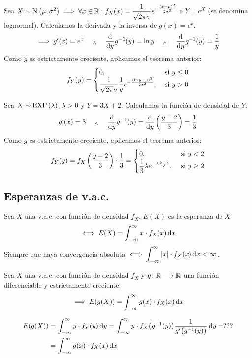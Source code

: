 \begin{ejem}
	Sea $\displaystyle X\sim\operatorname{N}\left(\mu, \sigma^2\right) \implies \forall x \in \mathbb{R}: f_X(x)=\frac{1}{\sqrt{2\pi}\sigma} e^{-\frac{(x-\mu)^2}{2\sigma^2}}$ e $Y=e^X$ (se denomina lognormal). Calculamos la derivada y la inversa de $g(x)=e^x$.
	\[\implies g'(x)=e^x \quad \we \quad  \odv{}{y} g^{-1} (y) = \ln{y} \quad \we \quad  \odv{}{y} g^{-1} (y) = \frac{1}{y}\]
	Como $g$ es estrictamente creciente, aplicamos el teorema anterior:
	\[f_Y(y) = \begin{cases}
			0,                                                                                 & \text{ si } y\leq 0 \\
			\ds \frac{1}{\sqrt{2\pi}\sigma} \frac{1}{y} e^{-\frac{(\ln{y}-\mu)^2}{2\sigma^2}}, & \text{ si } y>0     %
		\end{cases}\]
\end{ejem}

\begin{ejem}
	Sea $X\sim\operatorname{EXP}\left(\lambda\right), \lambda > 0$ y $Y=3X+2$. Calculamos la función de densidad de $Y$.
	\[g'(x) = 3 \quad \we \quad \odv{}{y} g^{-1}(y) = \odv{}{y}\left(\frac{y-2}{3}\right) = \frac{1}{3}\]
	Como $g$ es estrictamente creciente, aplicamos el teorema anterior:
	\[f_Y(y) = f_X\left(\frac{y-2}{3}\right) \cdot \frac{1}{3}= \begin{cases}
			0,                                                 & \text{ si } y<2     \\
			\displaystyle \frac{1}{3}\lambda e^{-\lambda \frac{y-2}{3}}, & \text{ si } y\geq 2
		\end{cases}\]
\end{ejem}

\subsection{Esperanzas de v.a.c.}
\begin{defn}[Esperanza]
	Sea $X$ una v.a.c. con función de densidad $f_X$. $E(X)$ es la esperanza de $X$
	\[\iff E(X) = \int_{-\infty}^{\infty} x \cdot f_X(x) \odif{x}\]
	Siempre que haya convergencia absoluta $\ds \iff \int_{-\infty}^{\infty} \abs{x} \cdot f_X(x) \odif{x} < \infty$.
\end{defn}

\begin{teo}
	Sea $X$ una v.a.c. con función de densidad $f_X$ y $g \colon \mathbb{R} \longrightarrow \mathbb{R}$ una función diferenciable y estrictamente creciente.
	\[\implies E(g(X)) = \int_{-\infty}^{\infty} g(x) \cdot f_X(x) \odif{x}\]
	\begin{dem}
		\[\begin{aligned} %
				E(g(X)) & = \int_{-\infty}^{\infty} y \cdot f_Y(y) \odif{y} = \int_{-\infty}^{\infty} y \cdot f_X\big(g^{-1}(y)\big) \frac{1}{g'\big(g^{-1}(y)\big)} \odif{y} = ??? \\
				        & = \int_{-\infty}^{\infty} g(x) \cdot f_X(x) \odif{x}
			\end{aligned}\]
	\end{dem}
\end{teo}

